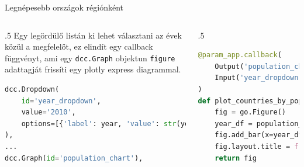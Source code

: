\documentclass[english, aspectratio=169]{beamer}
\begin{document}
	\begin{frame}[fragile]{Legnépesebb országok régiónként}
		\begin{columns}
			\begin{column}{.5\textwidth}
				Egy legördülő listán ki lehet választani az évek közül a megfelelőt, ez elindít egy callback függvényt, ami egy \texttt{dcc.Graph} objektun \texttt{figure} adattagját frissíti egy plotly express diagrammal.
				\begin{lstlisting}[language=python]
dcc.Dropdown(
	id='year_dropdown',
	value='2010',
	options=[{'label': year, 'value': str(year)} for year in range(1974, 2019)]
),
...
dcc.Graph(id='population_chart'),				
				\end{lstlisting}
			\end{column}
			\begin{column}{.5\textwidth}
				\begin{lstlisting}[language=python]
@param_app.callback(
	Output('population_chart', 'figure'),
	Input('year_dropdown', 'value')
)
def plot_countries_by_population(year):
	fig = go.Figure()
	year_df = population_df[['Country Name', year]].sort_values(year, ascending=False)[:20]
	fig.add_bar(x=year_df['Country Name'], y=year_df[year])
	fig.layout.title = f'A húsz legnépesebb ország - {year}'
	return fig				
				\end{lstlisting}
			\end{column}
		\end{columns}
	\end{frame}
	
\end{document}
